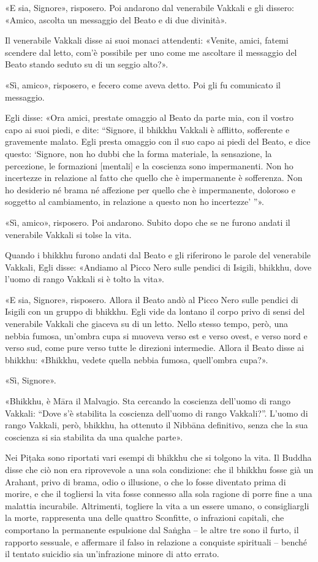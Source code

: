 «E sia, Signore», risposero. Poi andarono dal venerabile Vakkali e gli dissero:
«Amico, ascolta un messaggio del Beato e di due divinità».

Il venerabile Vakkali disse ai suoi monaci attendenti: «Venite, amici, fatemi
scendere dal letto, com’è possibile per uno come me ascoltare il messaggio del
Beato stando seduto su di un seggio alto?».

«Sì, amico», risposero, e fecero come aveva detto. Poi gli fu comunicato il
messaggio.

Egli disse: «Ora amici, prestate omaggio al Beato da parte mia, con il vostro
capo ai suoi piedi, e dite: “Signore, il bhikkhu Vakkali è afflitto, sofferente
e gravemente malato. Egli presta omaggio con il suo capo ai piedi del Beato, e
dice questo: ‘Signore, non ho dubbi che la forma materiale, la sensazione, la
percezione, le formazioni [mentali] e la coscienza sono impermanenti. Non ho
incertezze in relazione al fatto che quello che è impermanente è sofferenza. Non
ho desiderio né brama né affezione per quello che è impermanente, doloroso e
soggetto al cambiamento, in relazione a questo non ho incertezze’ ”».

«Sì, amico», risposero. Poi andarono. Subito dopo che se ne furono andati il
venerabile Vakkali si tolse la vita.

Quando i bhikkhu furono andati dal Beato e gli riferirono le parole del
venerabile Vakkali, Egli disse: «Andiamo al Picco Nero sulle pendici di Isigili,
bhikkhu, dove l’uomo di rango Vakkali si è tolto la vita».

«E sia, Signore», risposero. Allora il Beato andò al Picco Nero sulle pendici di
Isigili con un gruppo di bhikkhu. Egli vide da lontano il corpo privo di sensi
del venerabile Vakkali che giaceva su di un letto. Nello stesso tempo, però, una
nebbia fumosa, un’ombra cupa si muoveva verso est e verso ovest, e verso nord e
verso sud, come pure verso tutte le direzioni intermedie. Allora il Beato disse
ai bhikkhu: «Bhikkhu, vedete quella nebbia fumosa, quell’ombra cupa?».

«Sì, Signore».

«Bhikkhu, è Māra il Malvagio. Sta cercando la coscienza dell’uomo di rango
Vakkali: “Dove s’è stabilita la coscienza dell’uomo di rango Vakkali?”. L’uomo
di rango Vakkali, però, bhikkhu, ha ottenuto il Nibbāna definitivo, senza che la
sua coscienza si sia stabilita da una qualche parte».


 Nei Piṭaka sono riportati vari esempi di bhikkhu che
si tolgono la vita. Il Buddha disse che ciò non era riprovevole a una sola
condizione: che il bhikkhu fosse già un Arahant, privo di brama, odio o
illusione, o che lo fosse diventato prima di morire, e che il togliersi la vita
fosse connesso alla sola ragione di porre fine a una malattia incurabile.
Altrimenti, togliere la vita a un essere umano, o consigliargli la morte,
rappresenta una delle quattro Sconfitte, o infrazioni capitali, che comportano
la permanente espulsione dal Saṅgha – le altre tre sono il furto, il rapporto
sessuale, e affermare il falso in relazione a conquiste spirituali – benché il
tentato suicidio sia un’infrazione minore di atto errato.


